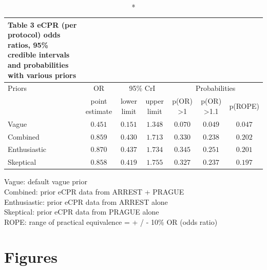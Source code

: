 \documentclass[
  super,
  preprint,
  3p]{elsarticle}
\begin{document}
\setlength{\LTpost}{0mm}
\begin{longtable}{lcccccc}
\caption*{
{\large Table 3 eCPR (per protocol) odds ratios, 95\% credible intervals and probabilities with various priors}
} \\ 
\toprule
Priors & OR & \multicolumn{2}{c}{95\% CrI} & \multicolumn{3}{c}{Probabilities} \\ 
\cmidrule(lr){1-1} \cmidrule(lr){2-2} \cmidrule(lr){3-4} \cmidrule(lr){5-7}
 & point estimate & lower limit & upper limit & p(OR) >1  & p(OR) >1.1  &  p(ROPE) \\ 
\midrule
Vague & $0.451$ & $0.151$ & $1.348$ & $0.070$ & $0.049$ & $0.047$ \\ 
Combined & $0.859$ & $0.430$ & $1.713$ & $0.330$ & $0.238$ & $0.202$ \\ 
Enthusiastic & $0.870$ & $0.437$ & $1.734$ & $0.345$ & $0.251$ & $0.201$ \\ 
Skeptical & $0.858$ & $0.419$ & $1.755$ & $0.327$ & $0.237$ & $0.197$ \\ 
\bottomrule
\end{longtable}
\begin{minipage}{\linewidth}
Vague: default vague prior\\
Combined: prior eCPR data from ARREST + PRAGUE\\
Enthusiastic: prior eCPR data from ARREST alone\\
Skeptical: prior eCPR data from PRAGUE alone\\
ROPE: range of practical equivalence = + / - 10\% OR (odds ratio)\\
\end{minipage}

\newpage

\hypertarget{figures}{%
\section{Figures}\label{figures}}
\end{document}
